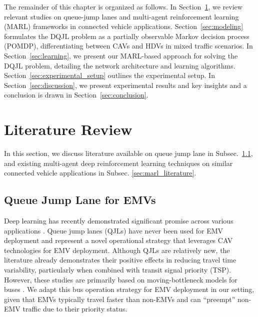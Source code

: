 The remainder of this chapter is organized as follows. In Section~\ref{sec:literature_review}, we review relevant studies on queue-jump lanes and multi-agent reinforcement learning (MARL) frameworks in connected vehicle applications. Section~\ref{sec:modeling} formulates the DQJL problem as a partially observable Markov decision process (POMDP), differentiating between CAVs and HDVs in mixed traffic scenarios. In Section~\ref{sec:learning}, we present our MARL-based approach for solving the DQJL problem, detailing the network architecture and learning algorithms. Section~\ref{sec:experimental_setup} outlines the experimental setup. In Section~\ref{sec:discussion}, we present experimental results and key insights and a conclusion is drawn in Section~\ref{sec:conclusion}.

\section{Literature Review}
\label{sec:literature_review}
In this section, we discuss literature available on queue jump lane in Subsec.~\ref{sec:dqjl_literature}, and existing multi-agent deep reinforcement learning techniques on similar connected vehicle applications in Subsec. \ref{sec:marl_literature}.

\subsection{Queue Jump Lane for EMVs}
\label{sec:dqjl_literature}
Deep learning has recently demonstrated significant promise across various applications \cite{you2019ct,you2018structurally,lyu2018super,lyu2019super,you2019low,you2020unsupervised,guha2020deep}.
Queue jump lanes (QJLs) have never been used for EMV deployment and represent a novel operational strategy that leverages CAV technologies for EMV deployment. Although QJLs are relatively new, the literature already demonstrates their positive effects in reducing travel time variability, particularly when combined with transit signal priority (TSP). However, these studies are primarily based on moving-bottleneck models for buses \cite{Zhou2005Performance,Cesme2015Queue,cheng2017body,cheng2016hybrid}. We adapt this bus operation strategy for EMV deployment in our setting, given that EMVs typically travel faster than non-EMVs and can “preempt” non-EMV traffic due to their priority status.

